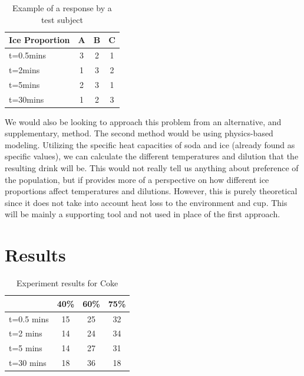 \documentclass[oneside,12pt]{report}
\def\prefacesection#1{
\chapter*{#1}
\addcontentsline{toc}{chapter}{#1}
}
\begin{document}
\begin{table}[ h]
\centering
\begin{tabular}{ l | c|c|c }
  Ice Proportion & A  & B & C  \\
\hline  
t=0.5mins & 3&2 &1\\ 
\hline  
t=2mins &1 &3 &2\\ 
\hline  
t=5mins  &2 &3 &1\\ 
\hline  
t=30mins &1 &2 &3\\ 
\hline  
   
 \end{tabular}
\caption{Example of a response by a test subject}

\end{table}
\vspace{6pt}

 We would also be looking to approach this problem from an alternative, and supplementary, method. The second method would be using physics-based modeling. Utilizing the specific heat capacities of soda and ice (already found as specific values), we can calculate the different temperatures and dilution that the resulting drink will be. This would not really tell us anything about preference of the population, but if provides more of a perspective on how different ice proportions affect temperatures and dilutions. However, this is purely theoretical since it does not take into account heat loss to the environment and cup. This will be mainly a supporting tool and not used in place of the first approach.


%

\prefacesection{Results}
\vspace{6pt}

\begin{table}[ h]
\centering
\begin{tabular}{ l || c|c|c }
  &40\% &60\% & 75\%  \\
\hline  
t=0.5 mins & 15 & 25 & 32\\ 
\hline  
t=2 mins & 14 & 24 & 34\\ 
\hline  
t=5 mins & 14 & 27 & 31\\ 
\hline  
t=30 mins & 18 & 36 & 18\\ 
\hline  
   
 \end{tabular}

\caption{Experiment results for Coke}

\end{table}
\end{document}
